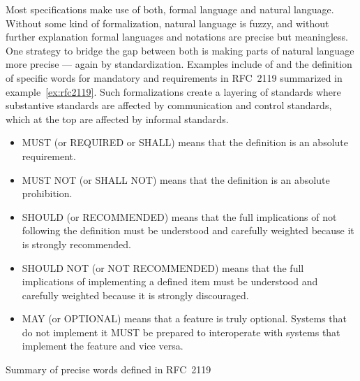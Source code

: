 Most specifications make use of both, formal language and natural language.
Without some kind of formalization, natural language is fuzzy, and without
further explanation formal languages and notations are precise but meaningless.
One strategy to bridge the gap between both is making parts of natural language
more precise --- again by standardization.  Examples include
 of  and the definition of specific words for
mandatory and  requirements in RFC~2119 \cite{Bradner1997}
summarized in example~\ref{ex:rfc2119}. Such formalizations create a layering
of standards where substantive standards are affected by communication and
control standards, which at the top are affected by informal standards.

\begin{example}
\begin{itemize}
 \item MUST (or REQUIRED or SHALL) means that the definition is
  an absolute requirement.
 \item MUST NOT (or SHALL NOT) means that the definition is an
  absolute prohibition.
 \item SHOULD (or RECOMMENDED) means that the full implications
  of not following the definition must be understood and carefully
  weighted because it is strongly recommended.
 \item SHOULD NOT (or NOT RECOMMENDED) means that the full implications
  of implementing a defined item must be understood and carefully weighted
  because it is strongly discouraged.
 \item MAY (or OPTIONAL) means that a feature is truly optional.
  Systems that do not implement it MUST be prepared to interoperate with 
  systems that implement the feature and vice versa.
\end{itemize}
\caption{Summary of precise words defined in RFC~2119}
\label{ex:rfc2119}
\end{example}


